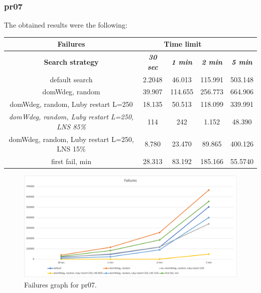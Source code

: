 \subsubsection{pr07}
The obtained results were the following:
{
\renewcommand{\arraystretch}{2}
\begin{longtable}[h]{| c | c | c | c | c |}
    \hline
    \textbf{Failures} & \multicolumn{3}{c}{Time limit} & \\
    \hline
    \textbf{Search strategy} & \textbf{\textit{30 sec}} & \textbf{\textit{1 min}} & \textbf{\textit{2 min}} & \textbf{\textit{5 min}} \\
    \hline
    \endhead
    default search                                         & 2.2048 &  46.013 & 115.991 & 503.148 \\
    \hline
    domWdeg, random                                        & 39.907 & 114.655 & 256.773 & 664.906 \\
    \hline
    domWdeg, random, Luby restart L=250                    & 18.135 &  50.513 & 118.099 & 339.991 \\
    \hline
    \textit{domWdeg, random, Luby restart L=250, LNS 85\%} &   114 &    242 &   1.152 &  48.390 \\
    \hline
    domWdeg, random, Luby restart L=250, LNS 15\%          &  8.780 &  23.470 &  89.865 & 400.126 \\
    \hline
    first fail, min                                        & 28.313 &  83.192 & 185.166 & 55.5740 \\
    \hline
\end{longtable}
}
\begin{figure}[H]
    \centering
    \includegraphics[width=1.0\columnwidth]{../graphs/pr07-failures.png}
    \caption{Failures graph for pr07.}
\end{figure}

